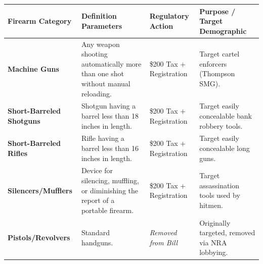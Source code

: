 \documentclass[
]{article}
\newcounter{none} %
\begin{document}
{\def\LTcaptype{none} %
\begin{longtable}[]{@{}
  >{\raggedright\arraybackslash}p{}
  >{\raggedright\arraybackslash}p{}
  >{\raggedright\arraybackslash}p{}
  >{\raggedright\arraybackslash}p{}@{}}
\toprule\noalign{}
\begin{minipage}[b]{\linewidth}\raggedright
Firearm Category
\end{minipage} & \begin{minipage}[b]{\linewidth}\raggedright
Definition Parameters
\end{minipage} & \begin{minipage}[b]{\linewidth}\raggedright
Regulatory Action
\end{minipage} & \begin{minipage}[b]{\linewidth}\raggedright
Purpose / Target Demographic
\end{minipage} \\
\midrule\noalign{}
\endhead
\bottomrule\noalign{}
\endlastfoot
\textbf{Machine Guns} & Any weapon shooting automatically more than one
shot without manual reloading. & \$200 Tax + Registration & Target
cartel enforcers (Thompson SMG). \\
\textbf{Short-Barreled Shotguns} & Shotgun having a barrel less than 18
inches in length. & \$200 Tax + Registration & Target easily concealable
bank robbery tools. \\
\textbf{Short-Barreled Rifles} & Rifle having a barrel less than 16
inches in length. & \$200 Tax + Registration & Target easily concealable
long guns. \\
\textbf{Silencers/Mufflers} & Device for silencing, muffling, or
diminishing the report of a portable firearm. & \$200 Tax + Registration
& Target assassination tools used by hitmen. \\
\textbf{Pistols/Revolvers} & Standard handguns. & \emph{Removed from
Bill} & Originally targeted, removed via NRA lobbying. \\
\end{longtable}
}
\end{document}
